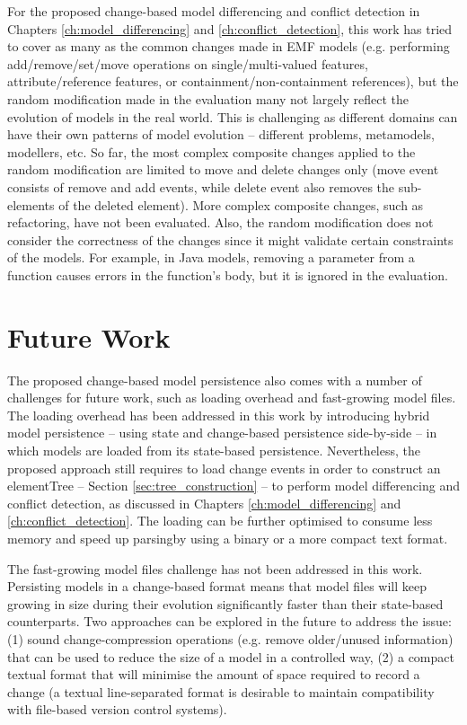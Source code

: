 For the proposed change-based model differencing and conflict detection in Chapters \ref{ch:model_differencing} and \ref{ch:conflict_detection}, this work has tried to cover as many as the common changes made in EMF models (e.g. performing \textsf{add}/\textsf{remove}/\textsf{set}/\textsf{move} operations on \textsf{single}/\textsf{multi}-\textsf{valued} features, \textsf{attribute}/\textsf{reference} features, or \textsf{containment}/\textsf{non}-\textsf{containment} references), but the random modification made in the evaluation many not largely reflect the evolution of models in the real world. This is challenging as different domains can have their own patterns of model evolution -- different problems, metamodels, modellers, etc. So far, the most complex composite changes applied to the random modification are limited to \textsf{move} and \textsf{delete} changes only (\textsf{move} event consists of \textsf{remove} and {add} events, while \textsf{delete} event also removes the sub-elements of the deleted element). More complex composite changes, such as refactoring, have not been evaluated. Also, the random modification does not consider the correctness of the changes since it might validate certain constraints of the models. For example, in Java \cite{eclipse2018modiscojava} models, removing a parameter from a function causes errors in the function's body, but it is ignored in the evaluation.  

\section{Future Work}
\label{future_work}
The proposed change-based model persistence also comes with a number of challenges for future work, such as loading overhead and fast-growing model files. The loading overhead has been addressed in this work by introducing hybrid model persistence -- using state and change-based persistence side-by-side -- in which models are loaded from its state-based persistence. Nevertheless, the proposed approach still requires to load change events in order to construct an \textsf{elementTree} -- Section \ref{sec:tree_construction} -- to perform model differencing and conflict detection, as discussed in Chapters \ref{ch:model_differencing} and \ref{ch:conflict_detection}. The loading can be further optimised to consume less memory and speed up parsingby using a binary or a more compact text format.

The fast-growing model files challenge has not been addressed in this work. Persisting models in a change-based format means that model files will keep growing in size during their evolution significantly faster than their state-based counterparts. Two approaches can be explored in the future to address the issue: (1) sound change-compression operations (e.g. remove older/unused information) that can be used to reduce the size of a model in a controlled way, (2) a compact textual format that will minimise the amount of space required to record a change (a textual line-separated format is desirable to maintain compatibility with file-based version control systems). 

